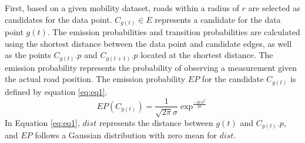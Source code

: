 \documentclass[preprint,12pt]{elsarticle}
\begin{document}
First, based on a given mobility dataset, roads within a radius of $r$ are selected as candidates for the data point.
$C_{g(t)}\in E$ represents a candidate for the data point $g(t)$.
The emission probabilities and transition probabilities are calculated using the shortest distance between the data point and candidate edges, as well as the points $C_{g(t)}.p$ and $C_{g(t+1)}.p$ located at the shortest distance.
The emission probability represents the probability of observing a measurement given the actual road position.
The emission probability $EP$ for the candidate $C_{g(t)}$ is defined by equation \ref{eq:eq1}.
\begin{equation}\label{eq:eq1}
	EP(C_{g(t)}) = \frac{1}{\sqrt{2\pi}\sigma }\exp^{\frac{-dist^2}{2\sigma}}
\end{equation}
In Equation \ref{eq:eq1}, $dist$ represents the distance between $g(t)$ and $C_{g(t)}.p$, and $EP$ follows a Gaussian distribution with zero mean for $dist$.
\end{document}

